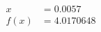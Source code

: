 \documentclass[preview]{standalone}
\begin{document}
\begin{align*}
x &= 0.0057\\f(x) &= 4.0170648
\end{align*}
\end{document}
